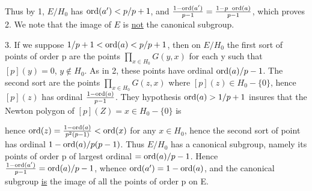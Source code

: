 \begin{kaproof}
Thus by 1, $E/H_0$ has $\operatorname{ord}(a')<p/p+1$, and
$\frac{1-\ord(a')}{p-1} = \frac{1-p\ \ord(a)}{p-1}$, which proves 2. We note
that the image of $E$ is \uline{not} the canonical subgroup.

3. If we suppose $1/p+1<\operatorname{ord}(a)<p/p+1$, then on $E/H_0$ the first sort of
points of order p are the points $\prod_{x\in H_0} G(y,x)$ for each y such that
$[p](y) = 0$, $y\notin H_0$. As in 2, these points have ordinal
$\operatorname{ord}(a)/p-1$. The second sort are the points $\prod_{x\in H_0} G(z,x)$ where
$[p](z)\in H_0-\{0\}$, hence $[p](z)$ has ordinal $\frac{1-\operatorname{ord}(a)}{p-1}$. They
hypothesis $\operatorname{ord}(a)>1/p+1$ insures that the Newton polygon of
$[p](Z) = x\in H_0-\{0\}$ is
\begin{center}
\end{center}
hence $\operatorname{ord}(z) = \frac{1-\operatorname{ord}(a)}{p^2(p-1)}<\operatorname{ord}(x)$ for any $x\in H_0$, hence
the second sort of point has ordinal $1-\operatorname{ord}(a)/p(p-1)$. Thus $E/H_0$ has a
canonical subgroup, namely its points of order p of largest ordinal
$=\operatorname{ord}(a)/p-1$. Hence $\frac{1-\operatorname{ord}(a')}{p-1} = \operatorname{ord}(a)/p-1$, whence
$\operatorname{ord}(a') = 1-\operatorname{ord}(a)$, and the canonical subgroup \uline{is} the image of all
the points of order p on E.


\end{kaproof}
